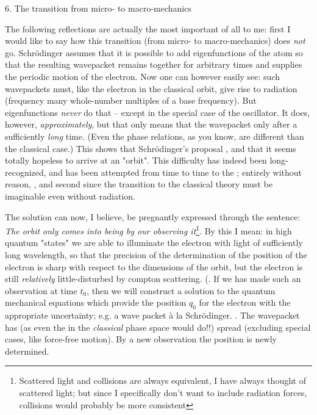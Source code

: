\documentclass{article}
\begin{document}
6. The transition from micro- to macro-mechanics

The following reflections are actually the most important of all to me: first I would like to say how this transition (from micro- to macro-mechanics) does \textit{not} go. Schr\"odinger assumes that it is possible to add eigenfunctions of the atom so that the resulting wavepacket remains together for arbitrary times and supplies the periodic motion of the electron. Now one can however easily see: such wavepackets must, like the electron in the classical orbit, give rise to radiation  (frequency many whole-number multiples of a base frequency). But eigenfunctions \textit{never} do that -- except in the special case of the oscillator. It does, however, \textit{approximately}, but that only means that the wavepacket only  after a sufficiently \textit{long} time. (Even the phase relations, as you know, are different than the classical case.) This shows that Schr\"odinger's proposal , and that it seems totally hopeless to arrive at an "orbit". This difficulty has indeed been long-recognized, and has been attempted from time to time to  the ; entirely without reason, , and second since the transition to the classical theory must be imaginable even without radiation.

The solution can now, I believe, be pregnantly expressed through the sentence: \textit{The orbit only comes into being by our observing it}\footnote{Scattered light and collisions are always equivalent, I have always thought of scattered light; but since I specifically don't want to include radiation forces, collisions would probably be more consistent}. By this I mean: in high quantum "states" we are able to illuminate the electron with light of sufficiently long wavelength, so that the precision of the determination of the position of the electron is sharp with respect to the dimensions of the orbit, but the electron is still \textit{relatively} little-disturbed by compton scattering. (. If we has made such an observation at time $t_0$, then we will construct a solution to the quantum mechanical equations which provide the position $q_0$ for the electron with the appropriate uncertainty; e.g. a wave packet \`a la Schr\"odinger. . The wavepacket has (as even the  in the \textit{classical} phase space would do!!) spread (excluding special cases, like force-free motion). By a new observation the position is newly determined. 
\end{document}
